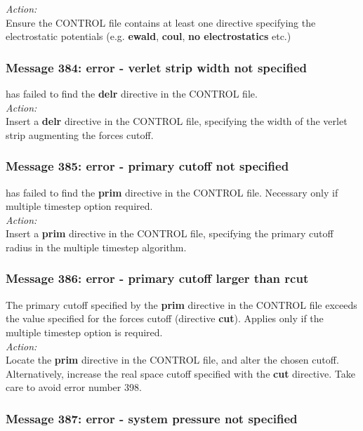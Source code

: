 \noindent
{\em Action:} \\ 
Ensure the CONTROL file contains at least one directive specifying the
electrostatic potentials  (e.g. {\bf ewald}, {\bf coul}, 
{\bf no electrostatics} etc.)

\subsubsection*{Message 384: error - verlet strip width not specified}

\D{} has failed to find the {\bf delr} directive in the CONTROL file.\\

\noindent
{\em Action:} \\ 
Insert a {\bf delr} directive in the CONTROL file, specifying the
width of the verlet strip augmenting the forces cutoff.

\subsubsection*{Message 385: error - primary cutoff not specified}

\D{} has failed to find the {\bf prim} directive in the CONTROL
file. Necessary only if multiple timestep  option required. \\

\noindent
{\em Action:} \\ 
Insert a {\bf prim} directive in the CONTROL file, specifying the
primary cutoff radius in the multiple timestep
algorithm.

\subsubsection*{Message 386: error - primary cutoff larger than rcut}

The primary cutoff specified by the {\bf prim} directive in the
CONTROL file exceeds the value specified for the forces cutoff
(directive {\bf cut}). Applies only if the multiple
timestep option
is required.\\

\noindent
{\em Action:} \\ 
Locate the {\bf prim} directive in the CONTROL file, and alter the
chosen cutoff. Alternatively, increase the real space cutoff specified
with the {\bf cut} directive. Take care to avoid error number 398.

\subsubsection*{Message 387: error - system pressure not specified}

